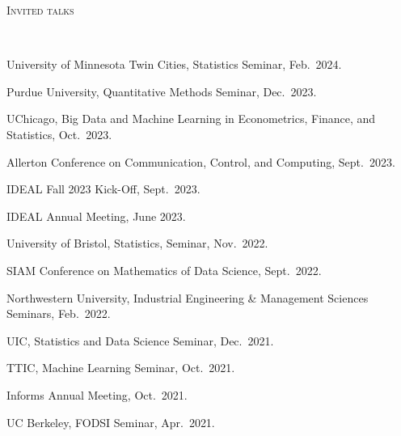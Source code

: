 \documentclass[a4paper, 10pt]{article}
\newenvironment{changemargin}[2]{%
  \begin{list}{}{%
    \setlength{\topsep}{0pt}%
    \setlength{\leftmargin}{#1}%
    \setlength{\rightmargin}{#2}%
    \setlength{\listparindent}{\parindent}%
    \setlength{\itemindent}{\parindent}%
    \setlength{\parsep}{\parskip}%
  }%
  \item[]}{\end{list}
}
\newcommand{\lineover}{
	\begin{changemargin}{-0.05in}{-0.05in}
		\vspace*{-8pt}
		\hrulefill \\
		\vspace*{-2pt}
	\end{changemargin}
}
\newcommand{\header}[1]{
	\begin{changemargin}{-0.5in}{-0.5in}
		\scshape{#1}\\
  	\lineover
	\end{changemargin}
}
\newenvironment{body} {
	\vspace*{-16pt}
	\begin{changemargin}{-0.3in}{-0.5in}
  }	
	{\end{changemargin}
}
\begin{document}
\bigskip
\header{\LARGE{Invited talks}}
\begin{body}
	\vspace{18pt}
	\begin{enumerate}[label={[{T}{{\arabic*}}]}]
	
	\item University of Minnesota Twin Cities, Statistics Seminar, Feb.~2024.
	\item Purdue University, Quantitative Methods Seminar, Dec.~2023.
	\item UChicago, Big Data and Machine Learning in Econometrics, Finance, and Statistics, Oct.~2023.
	\item Allerton Conference on Communication, Control, and Computing, Sept.~2023.
	
	\item IDEAL Fall 2023 Kick-Off, Sept.~2023.
	
	\item IDEAL Annual Meeting, June 2023.
	\item University of Bristol, Statistics, Seminar, Nov.~2022. 
	
	\item SIAM Conference on Mathematics of Data Science, Sept.~2022.
	
	\item Northwestern University, Industrial Engineering \& Management Sciences Seminars, Feb.~2022.
	
	\item UIC, Statistics and Data Science Seminar, Dec.~2021. 
	
	
	\item TTIC, Machine Learning Seminar, Oct.~2021.
	
	\item Informs Annual Meeting, Oct.~2021.
	
	\item UC Berkeley, FODSI Seminar, Apr.~2021. 
	

\end{enumerate}
\end{body}
\end{document}
